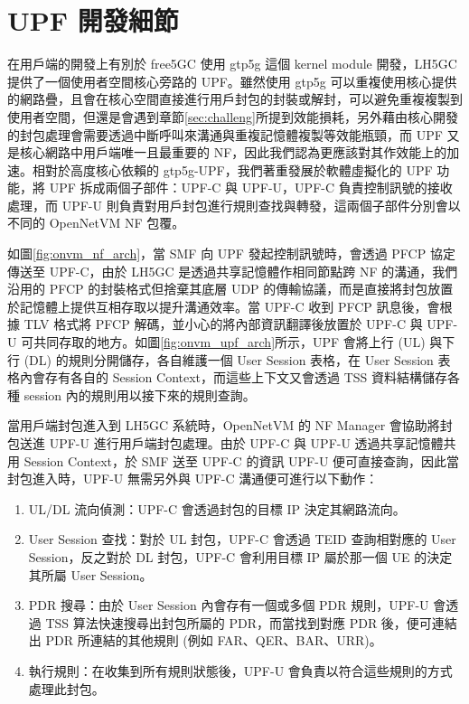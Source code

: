 \section{UPF 開發細節}
\label{sec:upf_porting}

在用戶端的開發上有別於 free5GC 使用 gtp5g 這個 kernel module 開發，LH5GC 提供了一個使用者空間核心旁路的 UPF。雖然使用 gtp5g 可以重複使用核心提供的網路疊，且會在核心空間直接進行用戶封包的封裝或解封，可以避免重複複製到使用者空間，但還是會遇到章節\ref{sec:challeng}所提到效能損耗，另外藉由核心開發的封包處理會需要透過中斷呼叫來溝通\cite{interrupt_process}與重複記憶體複製等效能瓶頸，而 UPF 又是核心網路中用戶端唯一且最重要的 NF，因此我們認為更應該對其作效能上的加速。相對於高度核心依賴的 gtp5g-UPF，我們著重發展於軟體虛擬化的 UPF 功能，將 UPF 拆成兩個子部件：UPF-C 與 UPF-U，UPF-C 負責控制訊號的接收處理，而 UPF-U 則負責對用戶封包進行規則查找與轉發，這兩個子部件分別會以不同的 OpenNetVM NF 包覆。

如圖\ref{fig:onvm_nf_arch}，當 SMF 向 UPF 發起控制訊號時，會透過 PFCP 協定傳送至 UPF-C，由於 LH5GC 是透過共享記憶體作相同節點跨 NF 的溝通，我們沿用的 PFCP 的封裝格式但捨棄其底層 UDP 的傳輸協議，而是直接將封包放置於記憶體上提供互相存取以提升溝通效率。當 UPF-C 收到 PFCP 訊息後，會根據 TLV 格式將 PFCP 解碼，並小心的將內部資訊翻譯後放置於 UPF-C 與 UPF-U 可共同存取的地方。如圖\ref{fig:onvm_upf_arch}所示，UPF 會將上行 (UL) 與下行 (DL) 的規則分開儲存，各自維護一個 User Session 表格，在 User Session 表格內會存有各自的 Session Context，而這些上下文又會透過 TSS 資料結構儲存各種 session 內的規則用以接下來的規則查詢。


當用戶端封包進入到 LH5GC 系統時，OpenNetVM 的 NF Manager 會協助將封包送進 UPF-U 進行用戶端封包處理。由於 UPF-C 與 UPF-U 透過共享記憶體共用 Session Context，於 SMF 送至 UPF-C 的資訊 UPF-U 便可直接查詢，因此當封包進入時，UPF-U 無需另外與 UPF-C 溝通便可進行以下動作：

\begin{enumerate}
\item UL/DL 流向偵測：UPF-C 會透過封包的目標 IP 決定其網路流向。
\item User Session 查找：對於 UL 封包，UPF-C 會透過 TEID 查詢相對應的 User Session，反之對於 DL 封包，UPF-C 會利用目標 IP 屬於那一個 UE 的決定其所屬 User Session。
\item PDR 搜尋：由於 User Session 內會存有一個或多個 PDR 規則，UPF-U 會透過 TSS 算法快速搜尋出封包所屬的 PDR，而當找到對應 PDR 後，便可連結出 PDR 所連結的其他規則 (例如 FAR、QER、BAR、URR)。
\item 執行規則：在收集到所有規則狀態後，UPF-U 會負責以符合這些規則的方式處理此封包。
\end{enumerate}

